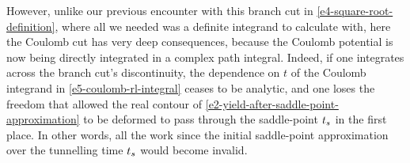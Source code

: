 However, unlike our previous encounter with this branch cut in \eqref{e4-square-root-definition}, where all we needed was a definite integrand to calculate with, here the Coulomb cut has very deep consequences, because the Coulomb potential is now being directly integrated in a complex path integral. Indeed, if one integrates across the branch cut's discontinuity, the dependence on $t$ of the Coulomb integrand in \eqref{e5-coulomb-rl-integral} ceases to be analytic, and one loses the freedom that allowed the real contour of \eqref{e2-yield-after-saddle-point-approximation} to be deformed to pass through the saddle-point ${t_s}$ in the first place. In other words, all the work since the initial saddle-point approximation over the tunnelling time ${t_s}$ would become invalid.





